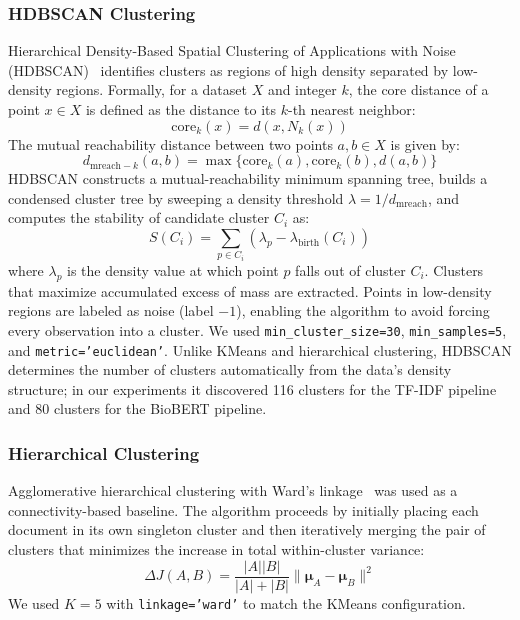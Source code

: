 \documentclass[a4paper,fleqn]{cas-dc}
\begin{document}
\subsubsection{HDBSCAN Clustering}

Hierarchical Density-Based Spatial Clustering of Applications with Noise (HDBSCAN)~\cite{ref22} identifies clusters as regions of high density separated by low-density regions. Formally, for a dataset $X$ and integer $k$, the core distance of a point $x \in X$ is defined as the distance to its $k$-th nearest neighbor:
\begin{equation}
\text{core}_k(x) = d(x, N_k(x))
\end{equation}
The mutual reachability distance between two points $a, b \in X$ is given by:
\begin{equation}
d_{\text{mreach}-k}(a, b) = \max \{ \text{core}_k(a), \text{core}_k(b), d(a, b) \}
\end{equation}
HDBSCAN constructs a mutual-reachability minimum spanning tree, builds a condensed cluster tree by sweeping a density threshold $\lambda = 1 / d_{\text{mreach}}$, and computes the stability of candidate cluster $C_i$ as:
\begin{equation}
S(C_i) = \sum_{p \in C_i} (\lambda_p - \lambda_{\text{birth}}(C_i))
\end{equation}
where $\lambda_p$ is the density value at which point $p$ falls out of cluster $C_i$. Clusters that maximize accumulated excess of mass are extracted. Points in low-density regions are labeled as noise (label $-1$), enabling the algorithm to avoid forcing every observation into a cluster. We used \texttt{min\_cluster\_size=30}, \texttt{min\_samples=5}, and \texttt{metric='euclidean'}. Unlike KMeans and hierarchical clustering, HDBSCAN determines the number of clusters automatically from the data's density structure; in our experiments it discovered 116 clusters for the TF-IDF pipeline and 80 clusters for the BioBERT pipeline.

\subsubsection{Hierarchical Clustering}

Agglomerative hierarchical clustering with Ward's linkage~\cite{ref25} was used as a connectivity-based baseline. The algorithm proceeds by initially placing each document in its own singleton cluster and then iteratively merging the pair of clusters that minimizes the increase in total within-cluster variance:
\begin{equation}
\Delta J(A, B) = \frac{|A| |B|}{|A| + |B|} \| \boldsymbol{\mu}_A - \boldsymbol{\mu}_B \|^2
\end{equation}
We used $K=5$ with \texttt{linkage='ward'} to match the KMeans configuration.
\end{document}
